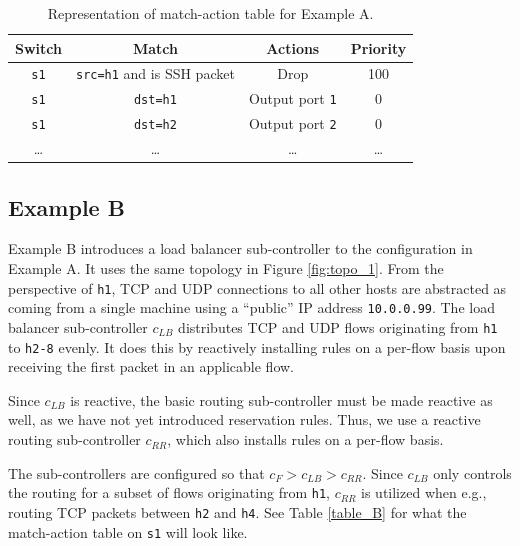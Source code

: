 \documentclass{article}
\begin{document}
\begin{table}
\begin{center}
\begin{tabular}{|c|c|c|c|}
\hline
Switch & Match & Actions & Priority \\
\hline
\texttt{s1} & \texttt{src=h1} and is SSH packet & Drop & 100 \\
\hline
\texttt{s1} & \texttt{dst=h1} & Output port \texttt{1} & 0 \\
\hline
\texttt{s1} & \texttt{dst=h2} & Output port \texttt{2} & 0 \\
\hline
\dots & \dots & \dots & \dots \\
\hline
\end{tabular}
\end{center}
\caption{Representation of match-action table for Example A.}
\label{table_A}
\end{table}

\subsection{Example B} \label{Ex_B}

Example B introduces a load balancer sub-controller to the configuration in
Example A.
It uses the same topology in Figure \ref{fig:topo_1}. 
From the perspective of \texttt{h1}, TCP and UDP connections to all other 
hosts are abstracted as  coming from a single machine using a ``public'' 
IP address \texttt{10.0.0.99}.
The load balancer sub-controller $c_{LB}$ distributes TCP and UDP 
flows originating from \texttt{h1} to \texttt{h2-8} evenly. It does this by
reactively installing rules on a per-flow basis upon receiving the
first packet in an applicable flow.

Since $c_{LB}$ is reactive, the basic routing sub-controller must be made
reactive as well, as we have not yet introduced reservation rules. 
Thus, we use a reactive routing sub-controller $c_{RR}$, which also 
installs rules on a per-flow basis.

The sub-controllers are configured so that $c_F > c_{LB} > c_{RR}$.
Since $c_{LB}$ only controls the routing for a subset of flows originating
from \texttt{h1},
$c_{RR}$ is utilized when e.g., routing TCP packets between 
\texttt{h2} and \texttt{h4}.
See Table \ref{table_B} for what the match-action table on \texttt{s1} 
will look like.
\end{document}
